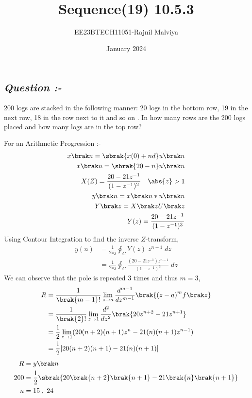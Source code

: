 \documentclass[journal,12pt,twocolumn]{IEEEtran}
\theoremstyle{remark}
\begin{document}
\title{Sequence(19) 10.5.3}
\author{EE23BTECH11051-Rajnil Malviya}
\date{January 2024}
\maketitle
\subsection*{\textit{Question :-}}
200 logs are stacked in the following manner: 20 logs in the bottom row, 19 in the next row,
18 in the row next to it and so on . In how many rows are the 200 logs placed
and how many logs are in the top row?

\begin{table}[h!]
   
        
       
    \end{table}
For an Arithmetic Progression :-
\begin{align}x\brak n=\sbrak {x(0)+n d} u \brak n\\
x\brak n=\sbrak{20-n} u \brak n\\
 X(Z)=\frac{20-21z^{-1}}{(1 - z^{-1})^2}  \quad \abs{ z} > 1\\
y \brak n = x\brak n*u\brak n\\
Y \brak z = X\brak zU\brak z\\\
Y(z) = \frac{20-21z^{-1}}{(1 - z^{-1})^3}\end{align}
 Using Contour Integration to find the inverse $Z$-transform,
\begin{align}
    y(n)&=\frac{1}{2\pi j}\oint_{C}Y(z) \;z^{n-1} \;dz  \\
    &=\frac{1}{2\pi j}\oint_{C} \frac{(20-21z^{-1}) z^{n-1}}{(1 - z^{-1})^3} \;dz 
\end{align}
We can observe that the pole is repeated $3$ times and thus $m=3$,
\begin{align}
    R&=\frac{1}{\brak {m-1}!}\lim\limits_{z\to a}\frac{d^{m-1}}{dz^{m-1}}\brak {{(z-a)}^{m}f\brak z}  \\
    &=\frac{1}{\brak {2}!}\lim\limits_{z\to 1}\frac{d^{2}}{dz^{2}}\brak {20 z^{n+2}-21 z^{n+1}}   \\
    &=\frac{1}{2}\lim\limits_{z\to 1}(20(n+2)(n+1)z^{n}-21(n)(n+1)z^{n-1})   \\
    &=\frac{1}{2}[20(n+2)(n+1)-21(n)(n+1)]\end{align}
      \begin{align}
       R &= y\brak n \\
  200 &=\frac{1}{2}\sbrak{20\brak{n+2}\brak{n+1}-21\brak{n}\brak{n+1}}\\
   n &=15\; ,\;24\end{align}
\end{document}
